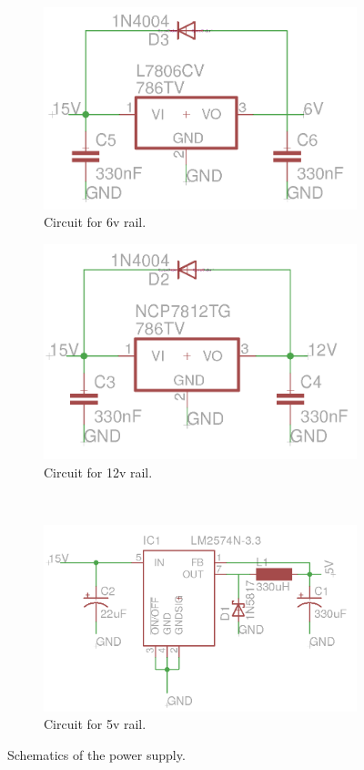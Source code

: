 \begin{figure}[h!]
	\begin{subfigure}{.48\linewidth}
		\includegraphics[width=\linewidth]{images/linear6v}
		\caption{Circuit for 6v rail.}
		\label{fig:psu6v}
	\end{subfigure}
	\begin{subfigure}{.48\linewidth}
		\includegraphics[width=\linewidth]{images/linear12v}
		\caption{Circuit for 12v rail.}
		\label{fig:psu12v}
	\end{subfigure}\\
	\begin{subfigure}{\linewidth}
		\includegraphics[width=\linewidth]{images/switch5v}
		\caption{Circuit for 5v rail.}
		\label{fig:psu5v}
	\end{subfigure}
	\caption{Schematics of the power supply.}
	\label{fig:psuschematic}
\end{figure}
